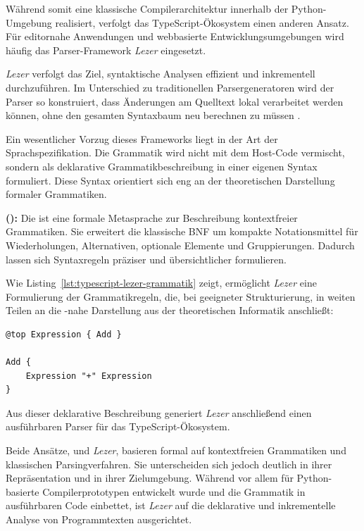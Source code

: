 Während \emph{} somit eine klassische Compilerarchitektur innerhalb der Python-Umgebung realisiert, verfolgt das TypeScript-Ökosystem einen anderen Ansatz. Für editornahe Anwendungen und webbasierte Entwicklungsumgebungen wird häufig das Parser-Framework \emph{Lezer} eingesetzt.

\emph{Lezer} verfolgt das Ziel, syntaktische Analysen effizient und inkrementell durchzuführen. Im Unterschied zu traditionellen Parsergeneratoren wird der Parser so konstruiert, dass Änderungen am Quelltext lokal verarbeitet werden können, ohne den gesamten Syntaxbaum neu berechnen zu müssen \autocite{lezer_docs}.

Ein wesentlicher Vorzug dieses Frameworks liegt in der Art der Sprachspezifikation. Die Grammatik wird nicht mit dem Host-Code vermischt, sondern als deklarative Grammatikbeschreibung in einer eigenen Syntax formuliert. Diese Syntax orientiert sich eng an der theoretischen Darstellung formaler Grammatiken.

\begin{definition}
\label{def:ebnf}
\textbf{ ():}
Die  ist eine formale Metasprache zur Beschreibung kontextfreier Grammatiken. Sie erweitert die klassische BNF um kompakte Notationsmittel für Wiederholungen, Alternativen, optionale Elemente und Gruppierungen. Dadurch lassen sich Syntaxregeln präziser und übersichtlicher formulieren.
\end{definition}

Wie Listing~\ref{lst:typescript-lezer-grammatik} zeigt, ermöglicht \emph{Lezer} eine Formulierung der Grammatikregeln, die, bei geeigneter Strukturierung, in weiten Teilen an die -nahe Darstellung aus der theoretischen Informatik anschließt:

\begin{listing}[htbp]
    \caption{Ausschnitt einer Grammatik-Regel in Lezer}
    \label{lst:typescript-lezer-grammatik}
\begin{verbatim}
@top Expression { Add }

Add {
    Expression "+" Expression
}
\end{verbatim}
\end{listing}

Aus dieser deklarative Beschreibung generiert \emph{Lezer} anschließend einen ausführbaren Parser für das TypeScript-Ökosystem.

Beide Ansätze, \emph{} und \emph{Lezer}, basieren formal auf kontextfreien Grammatiken und klassischen Parsingverfahren. Sie unterscheiden sich jedoch deutlich in ihrer Repräsentation und in ihrer Zielumgebung. Während \emph{} vor allem für Python-basierte Compilerprototypen entwickelt wurde und die Grammatik in ausführbaren Code einbettet, ist \emph{Lezer} auf die deklarative und inkrementelle Analyse von Programmtexten ausgerichtet.

